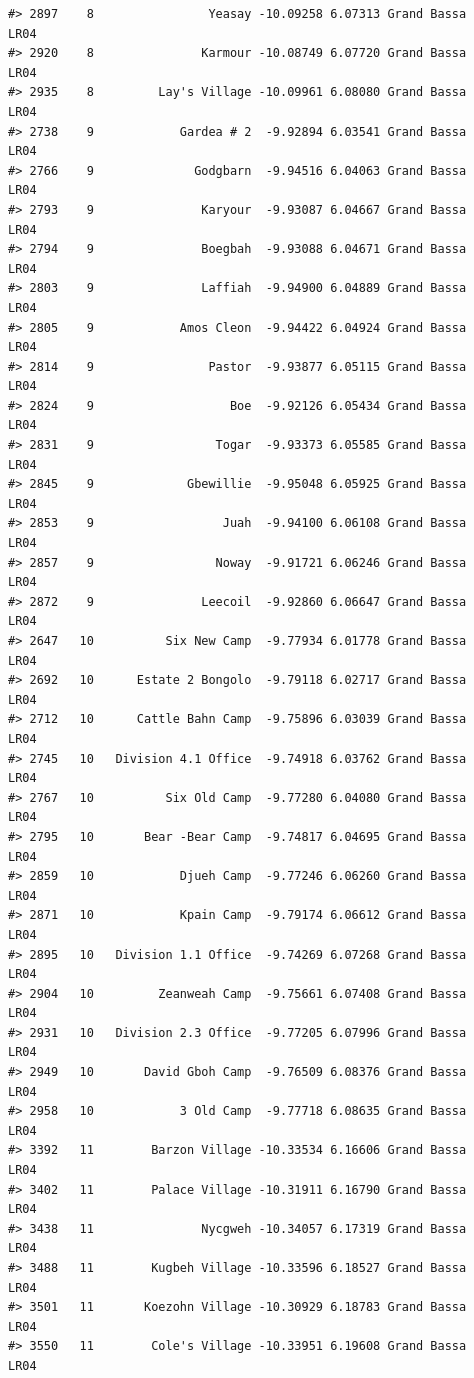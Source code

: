 \documentclass[12pt,a4paper]{book}
\theoremstyle{definition}
\theoremstyle{definition}
\theoremstyle{definition}
\theoremstyle{remark}
\begin{document}
\begin{verbatim}
#> 2897    8                Yeasay -10.09258 6.07313 Grand Bassa       LR04
#> 2920    8               Karmour -10.08749 6.07720 Grand Bassa       LR04
#> 2935    8         Lay's Village -10.09961 6.08080 Grand Bassa       LR04
#> 2738    9            Gardea # 2  -9.92894 6.03541 Grand Bassa       LR04
#> 2766    9              Godgbarn  -9.94516 6.04063 Grand Bassa       LR04
#> 2793    9               Karyour  -9.93087 6.04667 Grand Bassa       LR04
#> 2794    9               Boegbah  -9.93088 6.04671 Grand Bassa       LR04
#> 2803    9               Laffiah  -9.94900 6.04889 Grand Bassa       LR04
#> 2805    9            Amos Cleon  -9.94422 6.04924 Grand Bassa       LR04
#> 2814    9                Pastor  -9.93877 6.05115 Grand Bassa       LR04
#> 2824    9                   Boe  -9.92126 6.05434 Grand Bassa       LR04
#> 2831    9                 Togar  -9.93373 6.05585 Grand Bassa       LR04
#> 2845    9             Gbewillie  -9.95048 6.05925 Grand Bassa       LR04
#> 2853    9                  Juah  -9.94100 6.06108 Grand Bassa       LR04
#> 2857    9                 Noway  -9.91721 6.06246 Grand Bassa       LR04
#> 2872    9               Leecoil  -9.92860 6.06647 Grand Bassa       LR04
#> 2647   10          Six New Camp  -9.77934 6.01778 Grand Bassa       LR04
#> 2692   10      Estate 2 Bongolo  -9.79118 6.02717 Grand Bassa       LR04
#> 2712   10      Cattle Bahn Camp  -9.75896 6.03039 Grand Bassa       LR04
#> 2745   10   Division 4.1 Office  -9.74918 6.03762 Grand Bassa       LR04
#> 2767   10          Six Old Camp  -9.77280 6.04080 Grand Bassa       LR04
#> 2795   10       Bear -Bear Camp  -9.74817 6.04695 Grand Bassa       LR04
#> 2859   10            Djueh Camp  -9.77246 6.06260 Grand Bassa       LR04
#> 2871   10            Kpain Camp  -9.79174 6.06612 Grand Bassa       LR04
#> 2895   10   Division 1.1 Office  -9.74269 6.07268 Grand Bassa       LR04
#> 2904   10         Zeanweah Camp  -9.75661 6.07408 Grand Bassa       LR04
#> 2931   10   Division 2.3 Office  -9.77205 6.07996 Grand Bassa       LR04
#> 2949   10       David Gboh Camp  -9.76509 6.08376 Grand Bassa       LR04
#> 2958   10            3 Old Camp  -9.77718 6.08635 Grand Bassa       LR04
#> 3392   11        Barzon Village -10.33534 6.16606 Grand Bassa       LR04
#> 3402   11        Palace Village -10.31911 6.16790 Grand Bassa       LR04
#> 3438   11               Nycgweh -10.34057 6.17319 Grand Bassa       LR04
#> 3488   11        Kugbeh Village -10.33596 6.18527 Grand Bassa       LR04
#> 3501   11       Koezohn Village -10.30929 6.18783 Grand Bassa       LR04
#> 3550   11        Cole's Village -10.33951 6.19608 Grand Bassa       LR04

\end{verbatim}
\end{document}
